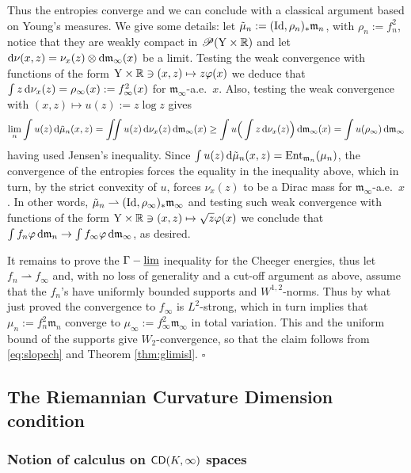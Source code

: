\documentclass[11pt]{article}
\numberwithin{equation}{section}
\newenvironment{idea}{\removelastskip\par\medskip   %
\noindent{\em Idea of the proof} \rm}{\penalty-20\null\hfill$\square$\par\medbreak}
\newcommand{\R}{\mathbb{R}}
\newcommand{\pr}{\mathscr P}
\newcommand{\Y}{{\rm Y}}
\newcommand{\mm}{{\mathfrak m}}
\newcommand{\CD}{{\sf CD}}
\newcommand{\entm}[1]{{\rm Ent}_{#1}}
\renewcommand{\d}{{\rm d}}
\newcommand{\limi}{\varliminf}
\newcommand{\weakto}{\rightharpoonup}
\newcommand{\Id}{{\rm Id}}
\DeclareMathOperator*{\glimi}{{\Gamma-\limi}}
\begin{document}
\begin{idea}
Thus the entropies converge and we can conclude with a classical argument based on Young's measures. We give some details: let $\tilde\mu_n:=(\Id,\rho_n)_*\mm_n$, with $\rho_n:=f_n^2$, notice that they are weakly compact in $\pr(\Y\times\R)$ and let $\d\nu(x,z)=\nu_x(z)\otimes\d\mm_\infty(x)$ be a limit. Testing the weak convergence with functions of the form $\Y\times\R\ni (x,z)\mapsto z\varphi(x)$ we deduce that $\int z\,\d\nu_x(z)=\rho_\infty(x):=f_\infty^2(x)$ for $\mm_\infty$-a.e.\ $x$. Also, testing the weak convergence with $(x,z)\mapsto u(z):=z\log z$ gives
\[
\lim_n\int u(z)\,\d\tilde\mu_n(x,z)=\iint u(z)\,\d\nu_x(z)\,\d\mm_\infty(x)\geq \int u\Big(\int z\,\d\nu_x(z)\Big)\,\d\mm_\infty(x)=\int u(\rho_\infty)\,\d\mm_\infty
\]
having used Jensen's inequality. Since $\int u(z)\,\d\tilde\mu_n(x,z)=\entm{\mm_n}(\mu_n)$, the convergence of the entropies forces the equality in the inequality above, which in turn, by the strict convexity of $u$, forces $\nu_x(z)$ to be a Dirac mass for $\mm_\infty$-a.e.\ $x$. In other words, $\tilde\mu_n\weakto (\Id,\rho_\infty)_*\mm_\infty$ and testing such weak convergence  with functions of the form $\Y\times\R\ni (x,z)\mapsto \sqrt{z}\varphi(x)$ we conclude that $\int f_n\varphi\,\d\mm_n\to\int f_\infty\varphi\,\d\mm_\infty$, as desired.

It remains to prove the $\glimi$ inequality for the Cheeger energies, thus let $f_n\weakto f_\infty$ and, with no loss of generality and a cut-off argument as above, assume that the $f_n$'s have uniformly bounded supports and $W^{1,2}$-norms.   Thus by what just proved the convergence to $f_\infty$ is $L^2$-strong, which in turn implies that $\mu_n:=f_n^2\mm_n$ converge to $\mu_\infty:=f_\infty^2\mm_\infty$ in  total variation. This and the uniform bound of the supports give $W_2$-convergence, so that the claim follows from \eqref{eq:slopech} and Theorem \ref{thm:glimisl}.
\end{idea}





\subsection{The Riemannian Curvature Dimension condition}



\subsubsection{Notion of calculus on $\CD(K,\infty)$ spaces}
\end{document}

